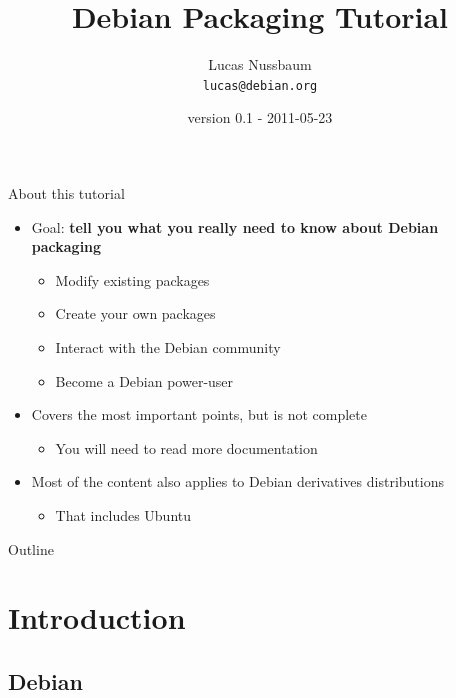 \documentclass[10pt,final]{beamer}
\title{Debian Packaging Tutorial}
\author[]{Lucas Nussbaum\\{\small\texttt{lucas@debian.org}}}
\date{\footnotesize version 0.1 - 2011-05-23}
\begin{document}
\frame{\titlepage}

\begin{frame}{About this tutorial}
  \begin{itemize}
  \item Goal: \textbf{tell you what you really need to know about Debian packaging}
    \begin{itemize}
      \hbr
    \item Modify existing packages
      \hbr
    \item Create your own packages
	    \hbr
    \item Interact with the Debian community
      \hbr
    \item Become a Debian power-user
    \end{itemize}
    \br
  \item Covers the most important points, but is not complete
    \begin{itemize}
    \item You will need to read more documentation
    \end{itemize}
    \br
  \item Most of the content also applies to Debian derivatives distributions
    \begin{itemize}
      \hbr
    \item That includes Ubuntu
    \end{itemize}
  \end{itemize}
\end{frame}

\begin{frame}{Outline}
  \tableofcontents[hideallsubsections]
\end{frame}

\section{Introduction}

\subsection{Debian}
\end{document}
